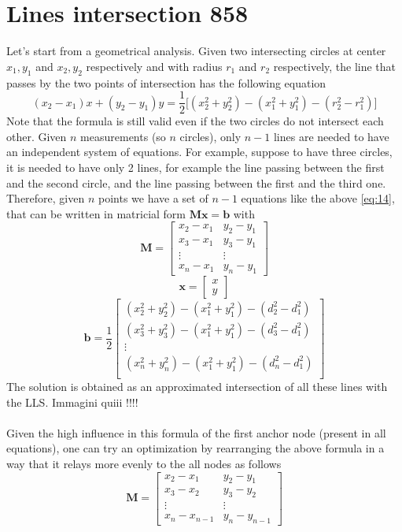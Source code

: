 \documentclass[12pt,twoside]{report}
\begin{document}
\section{Lines intersection 858}
Let's start from a geometrical analysis. Given two intersecting circles at center $x_{1},y_{1}$ and $x_{2},y_{2}$ respectively and with radius $r_1$ and $r_2$ respectively, the line that passes by the two points of intersection has the following equation \cite{rzk}
\begin{equation}
    (x_2-x_1)x+(y_2-y_1)y=\frac{1}{2}\big[(x_2^2+y_2^2)-(x_1^2+y_1^2)-(r_2^2-r_1^2)\big]
\end{equation}
Note that the formula is still valid even if the two circles do not intersect each other.
Given $n$ measurements (so $n$ circles), only $n-1$ lines are needed to have an independent system of equations. For example, suppose to have three circles, it is needed to have only 2 lines, for example the line passing between the first and the second circle, and the line passing between the first and the third one.
Therefore, given $n$ points we have a set of $n-1$ equations like the above \ref{eq:14}, that can be written in matricial form $\mathbf{Mx}=\mathbf{b}$ with
$$\mathbf{M}=\begin{bmatrix}
x_2-x_1&y_2-y_1\\
x_3-x_1&y_3-y_1\\
\vdots&\vdots\\
x_n-x_1&y_n-y_1
\end{bmatrix}$$
$$\mathbf{x}=\begin{bmatrix}
x\\
y
\end{bmatrix}$$
$$\mathbf{b}=\frac{1}{2}\begin{bmatrix}
(x^2_2+y^2_2)-(x_1^2+y^2_1)-(d_2^2-d_1^2)\\
(x^2_3+y^2_3)-(x_1^2+y^2_1)-(d_3^2-d_1^2)\\
\vdots\\
(x^2_n+y^2_n)-(x_1^2+y^2_1)-(d_n^2-d_1^2)\\
\end{bmatrix}$$
The solution is obtained as an approximated intersection of all these lines with the LLS. Immagini quiii !!!!\\\\
Given the high influence in this formula of the first anchor node (present in all equations), one can try an optimization by rearranging the above formula in a way that it relays more evenly to the all nodes as follows
$$\mathbf{M}=\begin{bmatrix}
x_2-x_1&y_2-y_1\\
x_3-x_2&y_3-y_2\\
\vdots&\vdots\\
x_n-x_{n-1}&y_n-y_{n-1}
\end{bmatrix}$$
\end{document}
